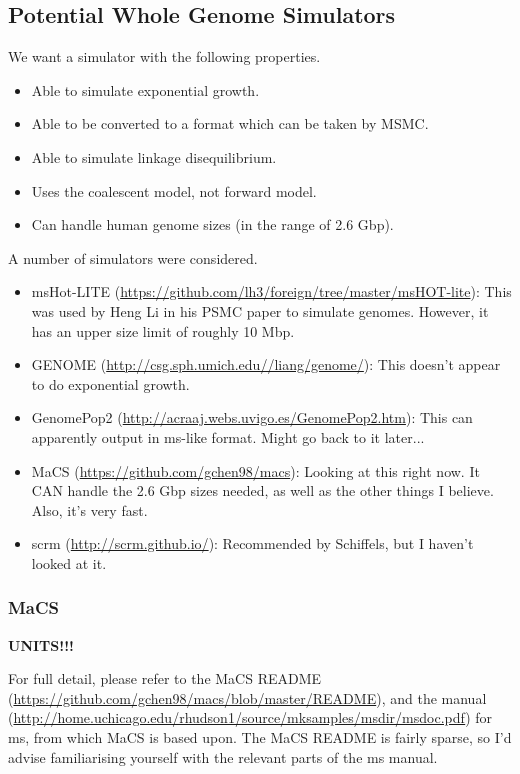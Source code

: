 \documentclass[11pt,a4paper]{article}
\begin{document}


\subsection{Potential Whole Genome Simulators}
We want a simulator with the following properties.
\begin{itemize}
\item Able to simulate exponential growth.
\item Able to be converted to a format which can be taken by MSMC.
\item Able to simulate linkage disequilibrium.
\item Uses the coalescent model, not forward model.
\item Can handle human genome sizes (in the range of 2.6 Gbp).
\end{itemize}
A number of simulators were considered.
\begin{itemize}
\item msHot-LITE (\url{https://github.com/lh3/foreign/tree/master/msHOT-lite}): This was used by Heng Li in his PSMC paper to simulate genomes. However, it has an upper size limit of roughly 10 Mbp.
\item GENOME (\url{http://csg.sph.umich.edu//liang/genome/}): This doesn't appear to do exponential growth.
\item GenomePop2 (\url{http://acraaj.webs.uvigo.es/GenomePop2.htm}): This can apparently output in ms-like format. Might go back to it later...
\item MaCS (\url{https://github.com/gchen98/macs}): Looking at this right now. It CAN handle the 2.6 Gbp sizes needed, as well as the other things I believe. Also, it's very fast.
\item scrm (\url{http://scrm.github.io/}): Recommended by Schiffels, but I haven't looked at it.
\end{itemize}

\subsubsection{MaCS}
\textbf{UNITS!!!}

For full detail, please refer to the MaCS README (\url{https://github.com/gchen98/macs/blob/master/README}), and the manual (\url{http://home.uchicago.edu/rhudson1/source/mksamples/msdir/msdoc.pdf}) for ms\cite{hudson2002generating}, from which MaCS is based upon. The MaCS README is fairly sparse, so I'd advise familiarising yourself with the relevant parts of the ms manual.
\end{document}
